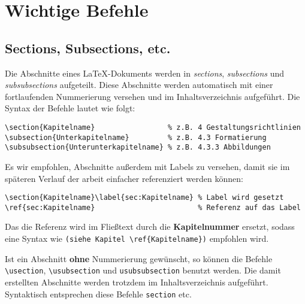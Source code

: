 \section{Wichtige Befehle}

\subsection{Sections, Subsections, etc.}

Die Abschnitte eines \LaTeX-Dokuments werden in \textit{sections}, \textit{subsections} und \textit{subsubsections} aufgeteilt.
Diese Abschnitte werden automatisch mit einer fortlaufenden Nummerierung versehen und im Inhaltsverzeichnis aufgeführt.
Die Syntax der Befehle lautet wie folgt:

\begin{verbatim}
\section{Kapitelname}                 % z.B. 4 Gestaltungsrichtlinien
\subsection{Unterkapitelname}         % z.B. 4.3 Formatierung
\subsubsection{Unterunterkapitelname} % z.B. 4.3.3 Abbildungen
\end{verbatim}

Es wir empfohlen, Abschnitte außerdem mit Labels zu versehen, damit sie im späteren Verlauf der arbeit einfacher referenziert werden können:

\begin{verbatim}
\section{Kapitelname}\label{sec:Kapitelname} % Label wird gesetzt
\ref{sec:Kapitelname}                        % Referenz auf das Label
\end{verbatim}

Das die Referenz wird im Fließtext durch die \textbf{Kapitelnummer} ersetzt, sodass eine Syntax wie \verb|(siehe Kapitel \ref{Kapitelname})| empfohlen wird.

Ist ein Abschnitt \textbf{ohne} Nummerierung gewünscht, so können die Befehle \verb|\usection|, \verb|\usubsection| und \verb|usubsubsection| benutzt werden.
Die damit erstellten Abschnitte werden trotzdem im Inhaltsverzeichnis aufgeführt.
Syntaktisch entsprechen diese Befehle \verb|section| etc.

